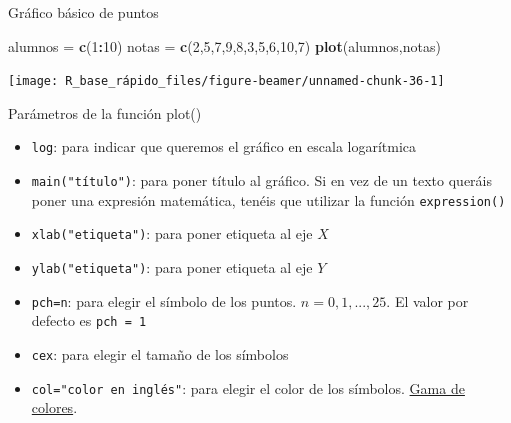 \documentclass[
  ignorenonframetext,
  aspectratio=169]{beamer}
\newenvironment{Shaded}{\begin{snugshade}}{\end{snugshade}}
\newcommand{\DecValTok}[1]{\textcolor[rgb]{0.00,0.00,0.81}{#1}}
\newcommand{\FunctionTok}[1]{\textcolor[rgb]{0.13,0.29,0.53}{\textbf{#1}}}
\newcommand{\NormalTok}[1]{#1}
\newcommand{\OtherTok}[1]{\textcolor[rgb]{0.56,0.35,0.01}{#1}}
\newcommand{\SpecialCharTok}[1]{\textcolor[rgb]{0.81,0.36,0.00}{\textbf{#1}}}
\providecommand{\tightlist}{%
  \setlength{\itemsep}{0pt}\setlength{\parskip}{0pt}}
\begin{document}
\begin{frame}[fragile]{Gráfico básico de puntos}
\label{gruxe1fico-buxe1sico-de-puntos-1}
\begin{Shaded}
\begin{Highlighting}[]
\NormalTok{alumnos }\OtherTok{=} \FunctionTok{c}\NormalTok{(}\DecValTok{1}\SpecialCharTok{:}\DecValTok{10}\NormalTok{)}
\NormalTok{notas }\OtherTok{=} \FunctionTok{c}\NormalTok{(}\DecValTok{2}\NormalTok{,}\DecValTok{5}\NormalTok{,}\DecValTok{7}\NormalTok{,}\DecValTok{9}\NormalTok{,}\DecValTok{8}\NormalTok{,}\DecValTok{3}\NormalTok{,}\DecValTok{5}\NormalTok{,}\DecValTok{6}\NormalTok{,}\DecValTok{10}\NormalTok{,}\DecValTok{7}\NormalTok{)}
\FunctionTok{plot}\NormalTok{(alumnos,notas)}
\end{Highlighting}
\end{Shaded}

\begin{center}\texttt{[image: R\_base\_rápido\_files/figure-beamer/unnamed-chunk-36-1]} \end{center}
\end{frame}

\begin{frame}[fragile]{Parámetros de la función plot()}
\label{paruxe1metros-de-la-funciuxf3n-plot}
\begin{itemize}
\tightlist
\item
  \texttt{log}: para indicar que queremos el gráfico en escala
  logarítmica
\item
  \texttt{main("título")}: para poner título al gráfico. Si en vez de un
  texto queráis poner una expresión matemática, tenéis que utilizar la
  función \texttt{expression()}
\item
  \texttt{xlab("etiqueta")}: para poner etiqueta al eje \(X\)
\item
  \texttt{ylab("etiqueta")}: para poner etiqueta al eje \(Y\)
\item
  \texttt{pch=n}: para elegir el símbolo de los puntos.
  \(n=0,1,...,25\). El valor por defecto es \texttt{pch\ =\ 1}
\item
  \texttt{cex}: para elegir el tamaño de los símbolos
\item
  \texttt{col="color\ en\ inglés"}: para elegir el color de los
  símbolos.
  \href{http://www.stat.columbia.edu/~tzheng/files/Rcolor.pdf}{Gama de
  colores}.
\end{itemize}
\end{frame}
\end{document}
